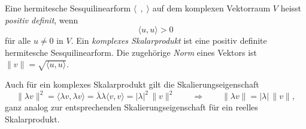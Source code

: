 \begin{definition}
Eine hermitesche Sesquilinearform $\langle\;\,,\;\rangle$
auf dem komplexen Vektorraum $V$ heisst {\em positiv definit}, wenn
\[
\langle u,u\rangle > 0
\]
für alle $u\ne 0$ in $V$.
Ein {\em komplexes Skalarprodukt} ist eine positiv definite hermitesche
Sesquilinearform.
Die zugehörige {\em Norm} eines Vektors ist
$\|v\| = \sqrt{\langle u, u\rangle}$.
\end{definition}

Auch für ein komplexes Skalarprodukt gilt die Skalierungseigenschaft
\[
\|\lambda v\|^2
=
\langle \lambda v,\lambda v\rangle
=
\overline{\lambda}\lambda\langle v,v\rangle
=
|\lambda|^2\,\|v\|^2
\qquad\Rightarrow\qquad
\|\lambda v\|
=
|\lambda|\, \|v\|,
\]
ganz analog zur entsprechenden Skalierungseigenschaft für ein
reelles Skalarprodukt.





